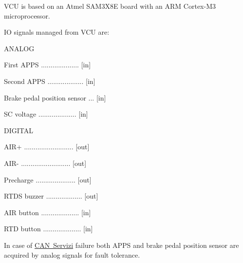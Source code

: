 V\+CU is based on an Atmel S\+A\+M3\+X8E board with an A\+RM Cortex-\/\+M3 microprocessor.

IO signals managed from V\+CU are\+:
\begin{DoxyItemize}
\item A\+N\+A\+L\+OG
\begin{DoxyEnumerate}
\item First A\+P\+PS .................... \mbox{[}in\mbox{]}
\item Second A\+P\+PS ................... \mbox{[}in\mbox{]}
\item Brake pedal position sensor ... \mbox{[}in\mbox{]}
\item SC voltage .................... \mbox{[}in\mbox{]}
\end{DoxyEnumerate}
\item D\+I\+G\+I\+T\+AL
\begin{DoxyEnumerate}
\item A\+I\+R+ .......................... \mbox{[}out\mbox{]}
\item A\+I\+R-\/ .......................... \mbox{[}out\mbox{]}
\item Precharge ..................... \mbox{[}out\mbox{]}
\item R\+T\+DS buzzer ................... \mbox{[}out\mbox{]}
\item A\+IR button .................... \mbox{[}in\mbox{]}
\item R\+TD button .................... \mbox{[}in\mbox{]}
\end{DoxyEnumerate}
\end{DoxyItemize}

In case of \mbox{\hyperlink{CAN_servizi_page}{C\+AN Servizi}} failure both A\+P\+PS and brake pedal position sensor are acquired by analog signals for fault tolerance. 